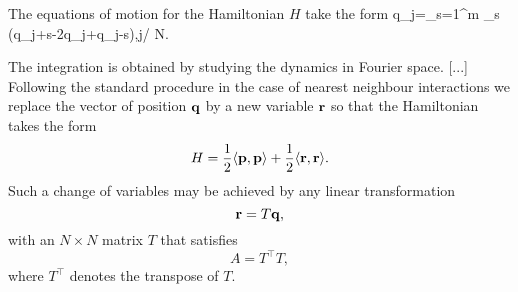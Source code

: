 The equations of motion  for the Hamiltonian $H$  take the form
\beq
{}q_j=\sum_{s=1}^m \kappa_s (q_{j+s}-2q_j+q_{j-s}),\quad j\in\integers / N\integers.
{
The integration is obtained  by studying the dynamics in Fourier space.
[...]
Following the standard procedure in the case of
nearest neighbour interactions we replace the vector of position ${\bf{q}}$ by
a new variable ${\bf{r}}$ so that the Hamiltonian takes the form
 \[
H=\frac{1}{2}\langle {\bf{p}},{\bf{p}}\rangle+\frac{1}{2}\langle{\bf{r}},{\bf{r}}\rangle.
\]
Such a change of variables may be achieved by any linear transformation
\begin{equation}
\label{GKMM21:r}
{\bf{r}}=T{\bf{q}},
\end{equation}
with an $N\times N$ matrix $T$ that satisfies
\begin{equation}
	\label{GKMM21:eq:T0}
		A = T^\intercal T,
	\end{equation}
where $ T^\intercal$ denotes the transpose of $T$.

}

